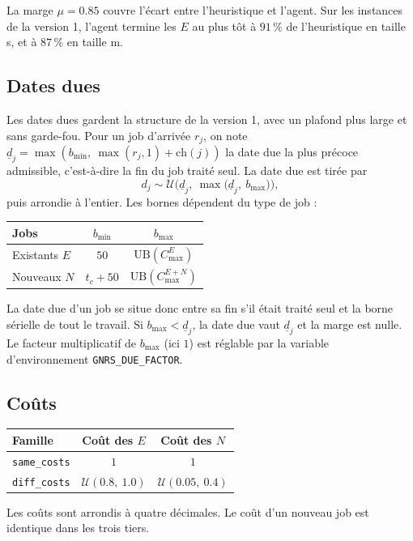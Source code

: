 \documentclass[11pt,a4paper]{article}
\newcommand{\UB}{\mathrm{UB}}
\newcommand{\charge}{\mathrm{ch}}
\begin{document}
La marge $\mu = 0.85$ couvre l'écart entre l'heuristique et l'agent.
Sur les instances de la version 1, l'agent termine les $E$ au plus tôt à $91\,\%$ de l'heuristique en taille s, et à $87\,\%$ en taille m.

\subsection{Dates dues}
\label{sec:due}

Les dates dues gardent la structure de la version 1, avec un plafond plus large et sans garde-fou.
Pour un job d'arrivée $r_j$, on note $\underline{d}_j = \max(b_{\min},\ \max(r_j, 1) + \charge(j))$ la date due la plus précoce admissible, c'est-à-dire la fin du job traité seul.
La date due est tirée par
\[
  d_j \sim \mathcal{U}\Big(\underline{d}_j,\ \max\big(\underline{d}_j,\ b_{\max}\big)\Big),
\]
puis arrondie à l'entier. Les bornes dépendent du type de job :
\begin{center}
\begin{tabular}{lcc}
\toprule
Jobs & $b_{\min}$ & $b_{\max}$ \\
\midrule
Existants $E$ & $50$ & $\UB(C^E_{\max})$ \\
Nouveaux $N$ & $t_c + 50$ & $\UB(C^{E+N}_{\max})$ \\
\bottomrule
\end{tabular}
\end{center}
La date due d'un job se situe donc entre sa fin s'il était traité seul et la borne sérielle de tout le travail.
Si $b_{\max} < \underline{d}_j$, la date due vaut $\underline{d}_j$ et la marge est nulle.
Le facteur multiplicatif de $b_{\max}$ (ici $1$) est réglable par la variable d'environnement \texttt{GNRS\_DUE\_FACTOR}.

\subsection{Coûts}
\label{sec:costs}

\begin{center}
\begin{tabular}{lcc}
\toprule
Famille & Coût des $E$ & Coût des $N$ \\
\midrule
\texttt{same\_costs} & $1$ & $1$ \\
\texttt{diff\_costs} & $\mathcal{U}(0.8,\ 1.0)$ & $\mathcal{U}(0.05,\ 0.4)$ \\
\bottomrule
\end{tabular}
\end{center}
Les coûts sont arrondis à quatre décimales.
Le coût d'un nouveau job est identique dans les trois tiers.
\end{document}
